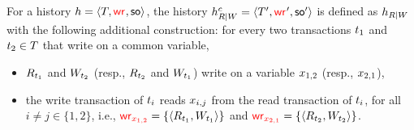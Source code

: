 For a history $\hist = \tup{T, \wro, \so}$, the history $\hist_{R|W}^c = \tup{T', \wro', \so'}$ is defined as $\hist_{R|W}$ with the following additional construction: for every two transactions $\tr_1$ and $\tr_2 \in T$ that write on a common variable,
\begin{itemize}
\item $R_{\tr_1}$ and $W_{\tr_2}$ (resp., $R_{\tr_2}$ and $W_{\tr_1}$) write on a variable $\xvar_{1,2}$ (resp., $\xvar_{2,1}$),
\item the write transaction of $\tr_i$ reads $\xvar_{i,j}$ from the read transaction of $\tr_i$, for all $i\neq j\in\{1,2\}$, i.e., $\wro[\xvar_{1,2}]= \{\tup{R_{\tr_1}, W_{\tr_1}}\}$ and $\wro[\xvar_{2,1}]= \{\tup{R_{\tr_2}, W_{\tr_2}}\}$.
\end{itemize}

